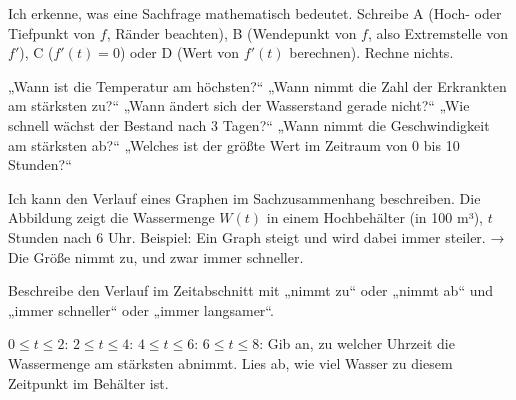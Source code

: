 \setcounter{aufgabe}{38}
\hypertarget{e5}{}

\begin{aufgabe}{Ich erkenne, was eine Sachfrage mathematisch bedeutet. Schreibe A (Hoch- oder Tiefpunkt von $f$, Ränder beachten), B (Wendepunkt von $f$, also Extremstelle von $f'$), C ($f'(t) = 0$) oder D (Wert von $f'(t)$ berechnen). Rechne nichts.}
\begin{teile}
\teil „Wann ist die Temperatur am höchsten?“ \leerfeld
\teil „Wann nimmt die Zahl der Erkrankten am stärksten zu?“ \leerfeld
\teil „Wann ändert sich der Wasserstand gerade nicht?“ \leerfeld
\teil „Wie schnell wächst der Bestand nach 3 Tagen?“ \leerfeld
\teil „Wann nimmt die Geschwindigkeit am stärksten ab?“ \leerfeld
\teil „Welches ist der größte Wert im Zeitraum von 0 bis 10 Stunden?“ \leerfeld
\end{teile}
\end{aufgabe}

\begin{aufgabe}{Ich kann den Verlauf eines Graphen im Sachzusammenhang beschreiben. Die Abbildung zeigt die Wassermenge $W(t)$ in einem Hochbehälter (in 100 m³), $t$ Stunden nach 6 Uhr.}
Beispiel: Ein Graph steigt und wird dabei immer steiler. → Die Größe nimmt zu, und zwar immer schneller.

\begin{ksys}[xmin=0,xmax=8,ymin=0,ymax=11,ablesen,xlabel=$t$ in h,ylabel=$W(t)$ in 100 m³]
\end{ksys}

Beschreibe den Verlauf im Zeitabschnitt mit „nimmt zu“ oder „nimmt ab“ und „immer schneller“ oder „immer langsamer“.
\begin{teile}
\teil $0 \le t \le 2$: \leerfeld \leerfeld
\teil $2 \le t \le 4$: \leerfeld \leerfeld
\teil $4 \le t \le 6$: \leerfeld \leerfeld
\teil $6 \le t \le 8$: \leerfeld \leerfeld
\teil Gib an, zu welcher Uhrzeit die Wassermenge am stärksten abnimmt. \leerfeld
\teil Lies ab, wie viel Wasser zu diesem Zeitpunkt im Behälter ist. \leerfeld
\end{teile}
\end{aufgabe}

